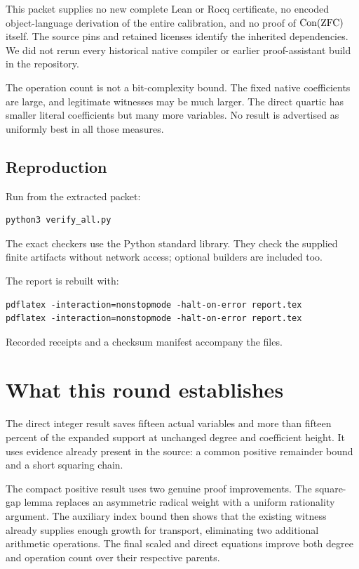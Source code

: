 This packet supplies no new complete Lean or Rocq certificate, no encoded
object-language derivation of the entire calibration, and no proof of
$\operatorname{Con}(\mathrm{ZFC})$ itself. The source pins and retained licenses identify the inherited
dependencies. We did not rerun every historical native compiler or earlier
proof-assistant build in the repository.

The operation count is not a bit-complexity bound. The fixed native
coefficients are large, and legitimate witnesses may be much larger.
The direct quartic has smaller literal coefficients but many more variables.
No result is advertised as uniformly best in all those measures.

\subsection{Reproduction}

Run from the extracted packet:
\begin{lstlisting}
python3 verify_all.py
\end{lstlisting}
The exact checkers use the Python standard library. They check the supplied
finite artifacts without network access; optional builders are included too.

The report is rebuilt with:
\begin{lstlisting}
pdflatex -interaction=nonstopmode -halt-on-error report.tex
pdflatex -interaction=nonstopmode -halt-on-error report.tex
\end{lstlisting}
Recorded receipts and a checksum manifest accompany the files.

\section{What this round establishes}

The direct integer result saves fifteen actual variables and more than
fifteen percent of the expanded support at unchanged degree and coefficient
height. It uses evidence already present in the source: a common positive
remainder bound and a short squaring chain.

The compact positive result uses two genuine proof improvements.
The square-gap lemma replaces an asymmetric radical weight with a uniform
rationality argument. The auxiliary index bound then shows that the
existing witness already supplies enough growth for transport, eliminating
two additional arithmetic operations. The final scaled and direct equations
improve both degree and operation count over their respective parents.

